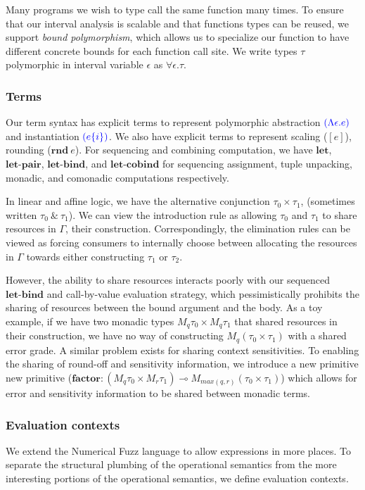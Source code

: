 Many programs we wish to type call the same function many times. To ensure that
our interval analysis is scalable and that functions types can be reused, we
support \textit{bound polymorphism}, which allows us to specialize our function
to have different concrete bounds for each function call site. We write types
$\tau$ polymorphic in interval variable $\epsilon$ as $\forall \epsilon. \tau$.

\subsubsection*{Terms}
Our term syntax has explicit terms to represent polymorphic abstraction
$\textcolor{blue}{(\Lambda \epsilon. e)}$ and instantiation $\textcolor{blue}{(e \{i\})}$. We also have
explicit terms to represent scaling ($[e]$), rounding ($\textbf{rnd}~e$).
For sequencing and combining computation, we have $\textbf{let}$,
$\textbf{let-pair}$, $\textbf{let-bind}$, and $\textbf{let-cobind}$ for
sequencing assignment, tuple unpacking, monadic, and comonadic computations
respectively.

In linear and affine logic, we have the alternative conjunction $\tau_0 \times
\tau_1$, (sometimes written $\tau_0~\&~\tau_1$). We can view the introduction
rule as allowing $\tau_0$ and $\tau_1$ to share resources in $\Gamma$, their
construction. Correspondingly, the elimination rules can be viewed as forcing
consumers to internally choose between allocating the resources in $\Gamma$
towards either constructing $\tau_1$ or $\tau_2$.

However, the ability to share resources interacts poorly with our sequenced
$\textbf{let-bind}$ and call-by-value evaluation strategy, which pessimistically
prohibits the sharing of resources between the bound argument and the body. As a
toy example, if we have two monadic types $M_q \tau_0 \times M_q \tau_1$ that
shared resources in their construction, we have no way of constructing $M_q
(\tau_0 \times \tau_1)$ with a shared error grade. A similar problem exists for
sharing context sensitivities. To enabling the sharing of round-off and
sensitivity information, we introduce a new primitive new primitive
($\textbf{factor} : (M_q \tau_0 \times M_r \tau_1) \multimap M_{max(q, r)}
(\tau_0 \times \tau_1)$) which allows for error and sensitivity information to
be shared between monadic terms.


\subsubsection*{Evaluation contexts}
We extend the Numerical Fuzz language to allow expressions in more places. To
separate the structural plumbing of the operational semantics from the more
interesting portions of the operational semantics, we define evaluation
contexts.


